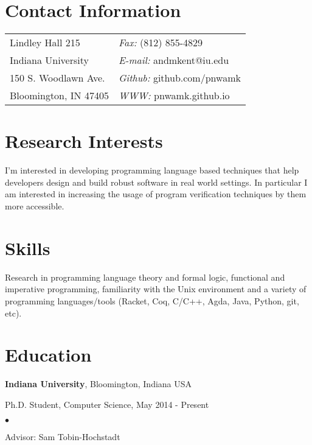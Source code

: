 \documentclass[margin,line]{res}
\newenvironment{list1}{
  \begin{list}{\ding{113}}{%
      \setlength{\itemsep}{0in}
      \setlength{\parsep}{0in} \setlength{\parskip}{0in}
      \setlength{\topsep}{0in} \setlength{\partopsep}{0in} 
      \setlength{\leftmargin}{0.17in}}}{\end{list}}
\newenvironment{list2}{
  \begin{list}{$\bullet$}{%
      \setlength{\itemsep}{0in}
      \setlength{\parsep}{0in} \setlength{\parskip}{0in}
      \setlength{\topsep}{0in} \setlength{\partopsep}{0in} 
      \setlength{\leftmargin}{0.2in}}}{\end{list}}
\begin{document}

\begin{resume}
\section{\sc Contact Information}
\vspace{.05in}
\begin{tabular}{@{}p{2in}p{4in}}
Lindley Hall 215            & {\it Fax:}  (812) 855-4829 \\            
Indiana University         & {\it E-mail:} andmkent@iu.edu    \\         
150 S. Woodlawn Ave.   & {\it Github:} github.com/pnwamk  \\       
Bloomington, IN 47405 & {\it WWW:} pnwamk.github.io \\     
\end{tabular}


\section{\sc Research Interests}
I'm interested in developing programming language based techniques
that help developers design and build robust software in real world
settings.  In particular I am interested in increasing the usage of
program verification techniques by them more accessible.

\section{\sc Skills}
Research in programming language theory and formal logic, functional
and imperative programming, familiarity with the Unix environment and
a variety of programming languages/tools (Racket, Coq, C/C++, Agda,
Java, Python, git, etc).

\section{\sc Education}
{\bf Indiana University}, Bloomington, Indiana USA\\
\vspace*{-.1in}
\begin{list1}
\item[] Ph.D. Student, Computer Science, May 2014 - Present
\begin{list2}
\vspace*{.05in}
\item Advisor:  Sam Tobin-Hochstadt
\end{list2}
\end{list1}


\end{resume}
\end{document}
